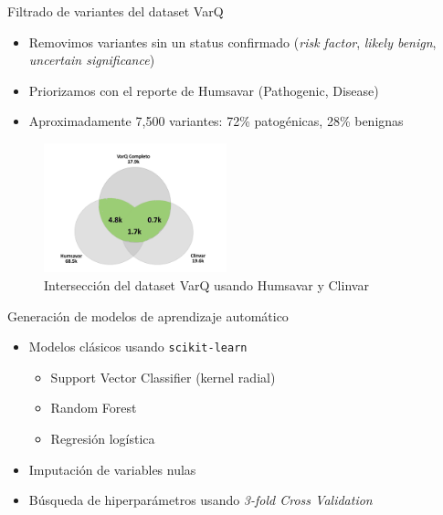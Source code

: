 \documentclass[
  spanish,
  ignorenonframetext,
]{beamer}
\providecommand{\tightlist}{%
  \setlength{\itemsep}{0pt}\setlength{\parskip}{0pt}}
\begin{document}
\begin{frame}{Filtrado de variantes del dataset VarQ}
\protect\hypertarget{filtrado-de-variantes-del-dataset-varq}{}

\begin{itemize}
\tightlist
\item
  Removimos variantes sin un status confirmado (\textit{risk factor},
  \textit{likely benign}, \textit{uncertain significance})
\item
  Priorizamos con el reporte de Humsavar (Pathogenic, Disease)
\item
  Aproximadamente 7,500 variantes: 72\% patogénicas, 28\% benignas
\end{itemize}

\begin{figure}
\centering
\includegraphics[width=2.08333in,height=\textheight]{interseccion_varq.pdf}
\caption{Intersección del dataset VarQ usando Humsavar y Clinvar}
\end{figure}

\end{frame}

\begin{frame}{Generación de modelos de aprendizaje automático}
\protect\hypertarget{generaciuxf3n-de-modelos-de-aprendizaje-automuxe1tico}{}

\begin{itemize}
\tightlist
\item
  Modelos clásicos usando \texttt{scikit-learn}

  \begin{itemize}
  \tightlist
  \item
    Support Vector Classifier (kernel radial)
  \item
    Random Forest
  \item
    Regresión logística
  \end{itemize}
\item
  Imputación de variables nulas
\item
  Búsqueda de hiperparámetros usando \textit{3-fold Cross Validation}
\end{itemize}

\end{frame}
\end{document}
